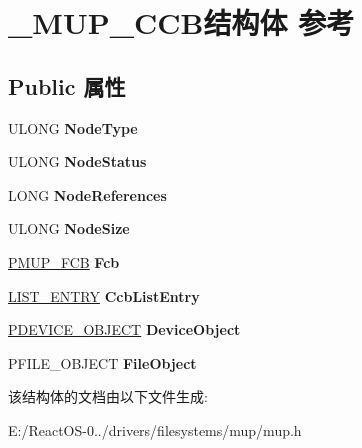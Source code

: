 \hypertarget{struct___m_u_p___c_c_b}{}\section{\+\_\+\+M\+U\+P\+\_\+\+C\+C\+B结构体 参考}
\label{struct___m_u_p___c_c_b}
\subsection*{Public 属性}
\begin{DoxyCompactItemize}
\item 
\mbox{\label{struct___m_u_p___c_c_b_af3ca18697ae647235f6847f0997adef9}} 
U\+L\+O\+NG {\bfseries Node\+Type}
\item 
\mbox{\label{struct___m_u_p___c_c_b_a70b826529c217ac6dd48f8950cdc87cb}} 
U\+L\+O\+NG {\bfseries Node\+Status}
\item 
\mbox{\label{struct___m_u_p___c_c_b_a36566e262e1e2cfdc179acbe8d673298}} 
L\+O\+NG {\bfseries Node\+References}
\item 
\mbox{\label{struct___m_u_p___c_c_b_a772d41443f27c6f183fe258c9b1a029a}} 
U\+L\+O\+NG {\bfseries Node\+Size}
\item 
\mbox{\label{struct___m_u_p___c_c_b_a71ca1440b14fbaad598b735c116f3704}} 
\hyperlink{struct___m_u_p___f_c_b}{P\+M\+U\+P\+\_\+\+F\+CB} {\bfseries Fcb}
\item 
\mbox{\label{struct___m_u_p___c_c_b_a4bf0c43faa6b134a498d4bfb8ba496c5}} 
\hyperlink{struct___l_i_s_t___e_n_t_r_y}{L\+I\+S\+T\+\_\+\+E\+N\+T\+RY} {\bfseries Ccb\+List\+Entry}
\item 
\mbox{\label{struct___m_u_p___c_c_b_a36e23727a2c926b77415292182c34251}} 
\hyperlink{struct___d_e_v_i_c_e___o_b_j_e_c_t}{P\+D\+E\+V\+I\+C\+E\+\_\+\+O\+B\+J\+E\+CT} {\bfseries Device\+Object}
\item 
\mbox{\label{struct___m_u_p___c_c_b_a9f0886ecb91b609ec1339a0f54923c63}} 
P\+F\+I\+L\+E\+\_\+\+O\+B\+J\+E\+CT {\bfseries File\+Object}
\end{DoxyCompactItemize}


该结构体的文档由以下文件生成\+:\begin{DoxyCompactItemize}
\item 
E\+:/\+React\+O\+S-\/0../drivers/filesystems/mup/mup.\+h\end{DoxyCompactItemize}
